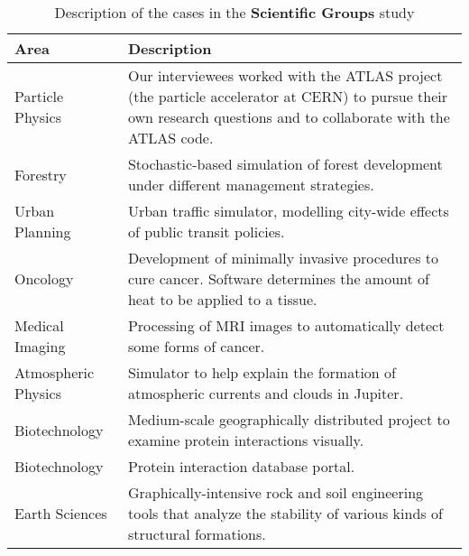 \begin{table}[tbp]
\caption{\label{tab:ScientificCases} Description of the cases in the \textbf{Scientific Groups} study}
\centering
\footnotesize{\begin{tabular}{p{3.4cm}p{10.2cm}}
\hline \hline
\vspace{1pt} \bfseries Area & \vspace{1pt} \bfseries Description \\
\hline
\vspace{0.5pt} Particle Physics & \vspace{0.5pt} Our interviewees worked with the ATLAS project (the particle accelerator at CERN) to pursue their own research questions and to collaborate with the ATLAS code. \\
\hline
\vspace{0.5pt} Forestry & \vspace{0.5pt} Stochastic-based simulation of forest development under different management strategies. \\
\hline
\vspace{0.5pt} Urban Planning & \vspace{0.5pt} Urban traffic simulator, modelling city-wide effects of public transit policies. \\
\hline
\vspace{0.5pt} Oncology & \vspace{0.5pt} Development of minimally invasive procedures to cure cancer. Software determines the amount of heat to be applied to a tissue. \\
\hline
\vspace{0.5pt} Medical Imaging & \vspace{0.5pt} Processing of MRI images to automatically detect some forms of cancer. \\
\hline
\vspace{0.5pt} Atmospheric Physics & \vspace{0.5pt} Simulator to help explain the formation of atmospheric currents and clouds in Jupiter.\\
\hline
\vspace{0.5pt} Biotechnology & \vspace{0.5pt} Medium-scale geographically distributed project to examine protein interactions visually. \\
\hline
\vspace{0.5pt} Biotechnology & \vspace{0.5pt} Protein interaction database portal. \\
\hline
\vspace{0.5pt} Earth Sciences & \vspace{0.5pt} Graphically-intensive rock and soil engineering tools that analyze the stability of various kinds of structural formations. \\
\hline
\end{tabular}}
\end{table}

